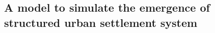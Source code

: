 \documentclass[10pt,a4paper]{article}
\theoremstyle{definition}
\theoremstyle{remark}
\begin{document}
\subsection{A model to simulate the emergence of structured urban settlement system}

\end{document}

